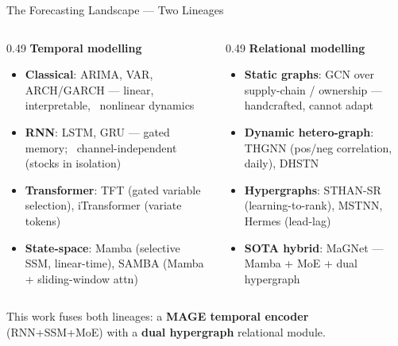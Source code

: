 \documentclass[aspectratio=169, 10pt]{beamer}
\newcommand{\xmark}{\textcolor{negative}{\textbf{\texttimes}}}
\begin{document}
\begin{frame}{The Forecasting Landscape — Two Lineages}
  \begin{columns}[T]
    \begin{column}{0.49\textwidth}
      \textbf{\textcolor{primary}{Temporal modelling}}
      \smallskip
      \begin{itemize}\setlength{\itemsep}{3pt}
        \item \textbf{Classical}: ARIMA, VAR, ARCH/GARCH — linear, interpretable, \xmark\ nonlinear dynamics
        \item \textbf{RNN}: LSTM, GRU — gated memory; \xmark\ \alert{channel-independent} (stocks in isolation)
        \item \textbf{Transformer}: TFT (gated variable selection), iTransformer (variate tokens)
        \item \textbf{State-space}: Mamba (selective SSM, linear-time), SAMBA (Mamba + sliding-window attn)
      \end{itemize}
    \end{column}
    \begin{column}{0.49\textwidth}
      \textbf{\textcolor{positive}{Relational modelling}}
      \smallskip
      \begin{itemize}\setlength{\itemsep}{3pt}
        \item \textbf{Static graphs}: GCN over supply-chain / ownership — handcrafted, cannot adapt
        \item \textbf{Dynamic hetero-graph}: \alert{THGNN} (pos/neg correlation, daily), DHSTN
        \item \textbf{Hypergraphs}: STHAN-SR (learning-to-rank), MSTNN, Hermes (lead-lag)
        \item \textbf{SOTA hybrid}: \alert{MaGNet} — Mamba + MoE + dual hypergraph
      \end{itemize}
    \end{column}
  \end{columns}
  \vspace{0.2cm}
  \centering\footnotesize
  This work fuses both lineages: a \textbf{MAGE temporal encoder} (RNN+SSM+MoE) with a
  \textbf{dual hypergraph} relational module.
\end{frame}
\end{document}
